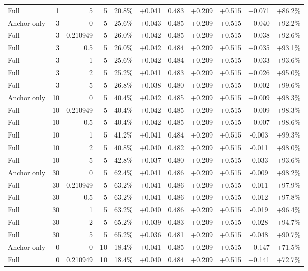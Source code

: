 \begin{table}[htbp]
\begin{tabular}{lrrrccccccc}
Full & 1 & 5 & 5 & 20.8\% & +0.041 & 0.483 & +0.209 & +0.515 & +0.071 & +86.2\% \\
Anchor only & 3 & 0 & 5 & 25.6\% & +0.043 & 0.485 & +0.209 & +0.515 & +0.040 & +92.2\% \\
Full & 3 & 0.210949 & 5 & 26.0\% & +0.042 & 0.485 & +0.209 & +0.515 & +0.038 & +92.6\% \\
Full & 3 & 0.5 & 5 & 26.0\% & +0.042 & 0.484 & +0.209 & +0.515 & +0.035 & +93.1\% \\
Full & 3 & 1 & 5 & 25.6\% & +0.042 & 0.484 & +0.209 & +0.515 & +0.033 & +93.6\% \\
Full & 3 & 2 & 5 & 25.2\% & +0.041 & 0.483 & +0.209 & +0.515 & +0.026 & +95.0\% \\
Full & 3 & 5 & 5 & 26.8\% & +0.038 & 0.480 & +0.209 & +0.515 & +0.002 & +99.6\% \\
Anchor only & 10 & 0 & 5 & 40.4\% & +0.042 & 0.485 & +0.209 & +0.515 & +0.009 & +98.3\% \\
Full & 10 & 0.210949 & 5 & 40.4\% & +0.042 & 0.485 & +0.209 & +0.515 & +0.009 & +98.3\% \\
Full & 10 & 0.5 & 5 & 40.4\% & +0.042 & 0.485 & +0.209 & +0.515 & +0.007 & +98.6\% \\
Full & 10 & 1 & 5 & 41.2\% & +0.041 & 0.484 & +0.209 & +0.515 & -0.003 & +99.3\% \\
Full & 10 & 2 & 5 & 40.8\% & +0.040 & 0.482 & +0.209 & +0.515 & -0.011 & +98.0\% \\
Full & 10 & 5 & 5 & 42.8\% & +0.037 & 0.480 & +0.209 & +0.515 & -0.033 & +93.6\% \\
Anchor only & 30 & 0 & 5 & 62.4\% & +0.041 & 0.486 & +0.209 & +0.515 & -0.009 & +98.2\% \\
Full & 30 & 0.210949 & 5 & 63.2\% & +0.041 & 0.486 & +0.209 & +0.515 & -0.011 & +97.9\% \\
Full & 30 & 0.5 & 5 & 63.2\% & +0.041 & 0.486 & +0.209 & +0.515 & -0.012 & +97.8\% \\
Full & 30 & 1 & 5 & 63.2\% & +0.040 & 0.486 & +0.209 & +0.515 & -0.019 & +96.4\% \\
Full & 30 & 2 & 5 & 65.2\% & +0.039 & 0.483 & +0.209 & +0.515 & -0.028 & +94.7\% \\
Full & 30 & 5 & 5 & 65.2\% & +0.036 & 0.481 & +0.209 & +0.515 & -0.048 & +90.7\% \\
Anchor only & 0 & 0 & 10 & 18.4\% & +0.041 & 0.485 & +0.209 & +0.515 & +0.147 & +71.5\% \\
Full & 0 & 0.210949 & 10 & 18.4\% & +0.040 & 0.484 & +0.209 & +0.515 & +0.141 & +72.7\% \\

\end{tabular}
\end{table}
